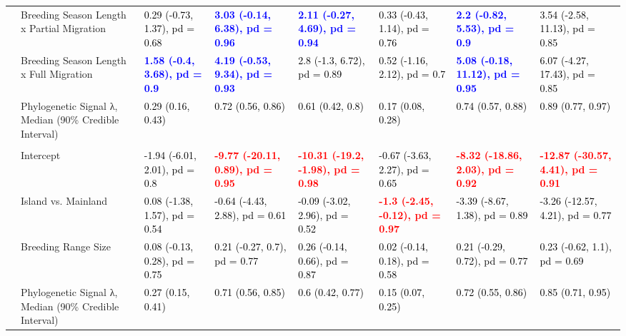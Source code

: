 \documentclass[
  a4paper,
]{article}
\begin{document}
\begin{landscape}
\begin{table}
{\begin{tabular}[t]{llllllll}
 & Breeding Season Length x Partial Migration & \textcolor{black}{0.29 (-0.73, 1.37), pd = 0.68} & \textcolor{blue}{\textbf{3.03 (-0.14, 6.38), pd = 0.96}} & \textcolor{blue}{\textbf{2.11 (-0.27, 4.69), pd = 0.94}} & \textcolor{black}{0.33 (-0.43, 1.14), pd = 0.76} & \textcolor{blue}{\textbf{2.2 (-0.82, 5.53), pd = 0.9}} & \textcolor{black}{3.54 (-2.58, 11.13), pd = 0.85}\\
 & Breeding Season Length x Full Migration & \textcolor{blue}{\textbf{1.58 (-0.4, 3.68), pd = 0.9}} & \textcolor{blue}{\textbf{4.19 (-0.53, 9.34), pd = 0.93}} & \textcolor{black}{2.8 (-1.3, 6.72), pd = 0.89} & \textcolor{black}{0.52 (-1.16, 2.12), pd = 0.7} & \textcolor{blue}{\textbf{5.08 (-0.18, 11.12), pd = 0.95}} & \textcolor{black}{6.07 (-4.27, 17.43), pd = 0.85}\\
 & Phylogenetic Signal λ, Median (90\% Credible Interval) & \textcolor{black}{0.29 (0.16, 0.43)} & \textcolor{black}{0.72 (0.56, 0.86)} & \textcolor{black}{0.61 (0.42, 0.8)} & \textcolor{black}{0.17 (0.08, 0.28)} & \textcolor{black}{0.74 (0.57, 0.88)} & \textcolor{black}{0.89 (0.77, 0.97)}\\
\addlinespace[0.3em]
\multicolumn{1}{l}{\textbf{Breeding Spacing}}\\
\hspace{1em} & Intercept & \textcolor{black}{-1.94 (-6.01, 2.01), pd = 0.8} & \textcolor{red}{\textbf{-9.77 (-20.11, 0.89), pd = 0.95}} & \textcolor{red}{\textbf{-10.31 (-19.2, -1.98), pd = 0.98}} & \textcolor{black}{-0.67 (-3.63, 2.27), pd = 0.65} & \textcolor{red}{\textbf{-8.32 (-18.86, 2.03), pd = 0.92}} & \textcolor{red}{\textbf{-12.87 (-30.57, 4.41), pd = 0.91}}\\
\hspace{1em} & Island vs. Mainland & \textcolor{black}{0.08 (-1.38, 1.57), pd = 0.54} & \textcolor{black}{-0.64 (-4.43, 2.88), pd = 0.61} & \textcolor{black}{-0.09 (-3.02, 2.96), pd = 0.52} & \textcolor{red}{\textbf{-1.3 (-2.45, -0.12), pd = 0.97}} & \textcolor{black}{-3.39 (-8.67, 1.38), pd = 0.89} & \textcolor{black}{-3.26 (-12.57, 4.21), pd = 0.77}\\
\hspace{1em} & Breeding Range Size & \textcolor{black}{0.08 (-0.13, 0.28), pd = 0.75} & \textcolor{black}{0.21 (-0.27, 0.7), pd = 0.77} & \textcolor{black}{0.26 (-0.14, 0.66), pd = 0.87} & \textcolor{black}{0.02 (-0.14, 0.18), pd = 0.58} & \textcolor{black}{0.21 (-0.29, 0.72), pd = 0.77} & \textcolor{black}{0.23 (-0.62, 1.1), pd = 0.69}\\
\hspace{1em} & Phylogenetic Signal λ, Median (90\% Credible Interval) & \textcolor{black}{0.27 (0.15, 0.41)} & \textcolor{black}{0.71 (0.56, 0.85)} & \textcolor{black}{0.6 (0.42, 0.77)} & \textcolor{black}{0.15 (0.07, 0.25)} & \textcolor{black}{0.72 (0.55, 0.86)} & \textcolor{black}{0.85 (0.71, 0.95)}\\

\end{tabular}}
\end{table}
\end{landscape}
\end{document}

